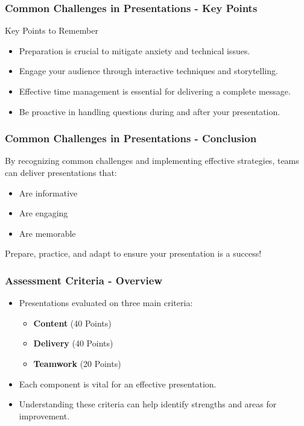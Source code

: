 \documentclass{beamer}
\begin{document}
\begin{frame}[fragile]
    \frametitle{Common Challenges in Presentations - Key Points}
    \begin{block}{Key Points to Remember}
        \begin{itemize}
            \item Preparation is crucial to mitigate anxiety and technical issues.
            \item Engage your audience through interactive techniques and storytelling.
            \item Effective time management is essential for delivering a complete message.
            \item Be proactive in handling questions during and after your presentation.
        \end{itemize}
    \end{block}
\end{frame}

\begin{frame}[fragile]
    \frametitle{Common Challenges in Presentations - Conclusion}
    By recognizing common challenges and implementing effective strategies, teams can deliver presentations that:
    \begin{itemize}
        \item Are informative
        \item Are engaging
        \item Are memorable
    \end{itemize}
    Prepare, practice, and adapt to ensure your presentation is a success!
\end{frame}

\begin{frame}[fragile]
    \frametitle{Assessment Criteria - Overview}
    \begin{itemize}
        \item Presentations evaluated on three main criteria: 
        \begin{itemize}
            \item \textbf{Content} (40 Points)
            \item \textbf{Delivery} (40 Points)
            \item \textbf{Teamwork} (20 Points)
        \end{itemize}
        \item Each component is vital for an effective presentation.
        \item Understanding these criteria can help identify strengths and areas for improvement.
    \end{itemize}
\end{frame}
\end{document}
